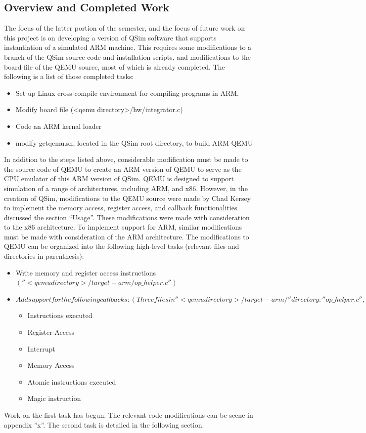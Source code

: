 \documentclass[letterpaper,11pt,twocolumn]{article}
\begin{document}
\subsection{Overview and Completed Work}
The focus of the latter portion of the semester, and the focus of future work on this project is on developing a version of QSim software that supports instantiation of a simulated ARM machine.  This requires some modifications to a branch of the QSim source code and installation scripts, and modifications to the board file of the QEMU source, most of which is already completed. The following is a list of those completed tasks:
\begin{itemize}
  \item{Set up Linux cross-compile environment for compiling programs in ARM.}
  \item{Modify board file (<qemu directory>/hw/integrator.c)}
  \item{Code an ARM kernal loader}
  \item{modify getqemu.sh, located in the QSim root directory, to build ARM QEMU}
\end{itemize}
In addition to the steps listed above, considerable modification must be made to the source code of QEMU to create an ARM version of QEMU to serve as the CPU emulator of this ARM version of QSim. QEMU is designed to support simulation of a range of architectures, including ARM, and x86. However, in the creation of QSim, modifications to the QEMU source were made by Chad Kersey to implement the memory access, register access, and callback functionalities discussed the section “Usage”. These modifications were made with consideration to the x86 architecture. To implement support for ARM, similar modifications must be made with consideration of the ARM architecture.  The modifications to QEMU can be organized into the following high-level tasks (relevant files and directories in parenthesis):
\begin{itemize}
	\item{Write memory and register access instructions $(''<qemu directory>/target-arm/op\_helper.c'')$}
	\item{$Add support for the following callbacks:
	(Three files in ''<qemu directory>/target-arm/'' directory: ''op\_helper.c'', ''translate.c'', ''helpers.h'')$
		\begin{itemize}
		\item{Instructions executed}
		\item{Register Access}
		\item{Interrupt}
		\item{Memory Access}
		\item{Atomic instructions executed}
		\item{Magic instruction}
		\end{itemize}
	}
\end{itemize}
Work on the first task has begun. The relevant code modifications can be scene in appendix ''x''. The second task is detailed in the following section.
\end{document}
